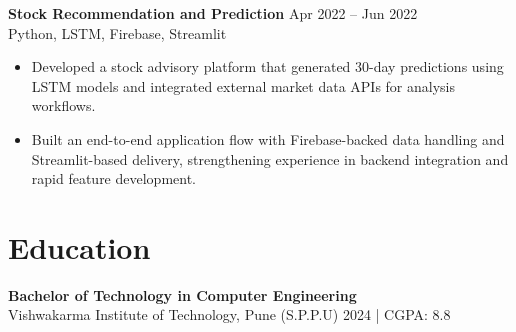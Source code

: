 \documentclass[10pt,letterpaper]{article}
\newcommand{\resumeSubheading}[4]{%
  \textbf{#1} \hfill #2 \\
  #3 \hfill #4 \\
}
\begin{document}
\resumeSubheading{Stock Recommendation and Prediction}{Apr 2022 -- Jun 2022}{}{Python, LSTM, Firebase, Streamlit}
\begin{itemize}
    \item Developed a stock advisory platform that generated 30-day predictions using LSTM models and integrated external market data APIs for analysis workflows.
    \item Built an end-to-end application flow with Firebase-backed data handling and Streamlit-based delivery, strengthening experience in backend integration and rapid feature development.
\end{itemize}

\section*{Education}
\resumeSubheading{Bachelor of Technology in Computer Engineering}{}{Vishwakarma Institute of Technology, Pune (S.P.P.U)}{2024 \enspace | \enspace CGPA: 8.8}
\end{document}

